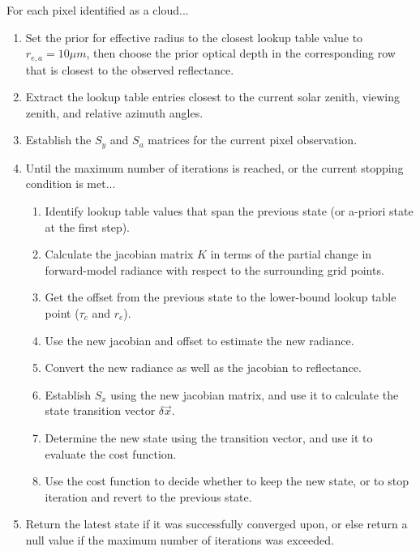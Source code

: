 \documentclass[12pt]{article}
\begin{document}
\noindent
For each pixel identified as a cloud...
\begin{enumerate}
    \item Set the prior for effective radius to the closest lookup table value to $r_{e,a} = 10\mu m$, then choose the prior optical depth in the corresponding row that is closest to the observed reflectance.
    \item Extract the lookup table entries closest to the current solar zenith, viewing zenith, and relative azimuth angles.
    \item Establish the $S_y$ and $S_a$ matrices for the current pixel observation.
    \item Until the maximum number of iterations is reached, or the current stopping condition is met...
        \begin{enumerate}[label*=\arabic*.]
            \item Identify lookup table values that span the previous state (or a-priori state at the first step).
            \item Calculate the jacobian matrix $K$ in terms of the partial change in forward-model radiance with respect to the surrounding grid points.
            \item Get the offset from the previous state to the lower-bound lookup table point ($\tau_c$ and $r_e$).
            \item Use the new jacobian and offset to estimate the new radiance.
            \item Convert the new radiance as well as the jacobian to reflectance.
            \item Establish $S_x$ using the new jacobian matrix, and use it to calculate the state transition vector $\delta \vec{x}$.
            \item Determine the new state using the transition vector, and use it to evaluate the cost function.
            \item Use the cost function to decide whether to keep the new state, or to stop iteration and revert to the previous state.
        \end{enumerate}
    \item Return the latest state if it was successfully converged upon, or else return a null value if the maximum number of iterations was exceeded.
\end{enumerate}

\clearpage

\vspace{-2em}
\end{document}
